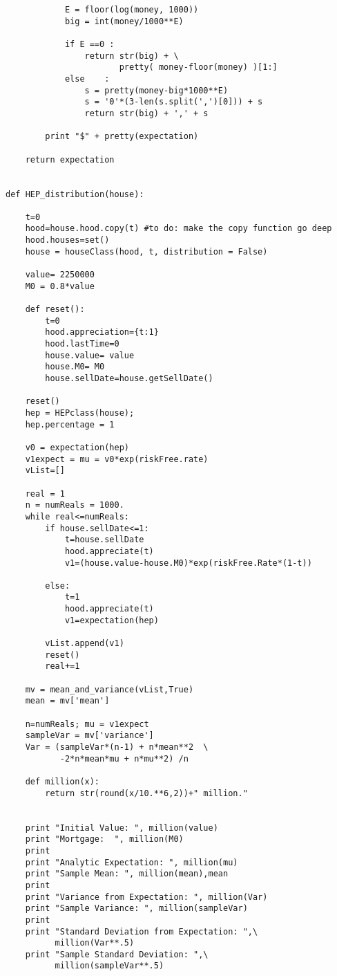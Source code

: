 \begin{lstlisting}
            E = floor(log(money, 1000))
            big = int(money/1000**E)
            
            if E ==0 :
                return str(big) + \
                       pretty( money-floor(money) )[1:]
            else    :
                s = pretty(money-big*1000**E)
                s = '0'*(3-len(s.split(',')[0])) + s
                return str(big) + ',' + s
            
        print "$" + pretty(expectation)

    return expectation


def HEP_distribution(house):
    
    t=0
    hood=house.hood.copy(t) #to do: make the copy function go deep
    hood.houses=set()
    house = houseClass(hood, t, distribution = False)
    
    value= 2250000  
    M0 = 0.8*value  

    def reset():
        t=0
        hood.appreciation={t:1}
        hood.lastTime=0
        house.value= value
        house.M0= M0
        house.sellDate=house.getSellDate()

    reset()
    hep = HEPclass(house);
    hep.percentage = 1

    v0 = expectation(hep)
    v1expect = mu = v0*exp(riskFree.rate)
    vList=[]
    
    real = 1
    n = numReals = 1000.
    while real<=numReals:
        if house.sellDate<=1:
            t=house.sellDate
            hood.appreciate(t)
            v1=(house.value-house.M0)*exp(riskFree.Rate*(1-t))

        else:
            t=1
            hood.appreciate(t)
            v1=expectation(hep)

        vList.append(v1)
        reset()
        real+=1

    mv = mean_and_variance(vList,True)
    mean = mv['mean']
    
    n=numReals; mu = v1expect
    sampleVar = mv['variance']
    Var = (sampleVar*(n-1) + n*mean**2  \
           -2*n*mean*mu + n*mu**2) /n

    def million(x):
        return str(round(x/10.**6,2))+" million."
    
    
    print "Initial Value: ", million(value)
    print "Mortgage:  ", million(M0)
    print
    print "Analytic Expectation: ", million(mu)
    print "Sample Mean: ", million(mean),mean
    print
    print "Variance from Expectation: ", million(Var)
    print "Sample Variance: ", million(sampleVar)
    print
    print "Standard Deviation from Expectation: ",\
          million(Var**.5)
    print "Sample Standard Deviation: ",\
          million(sampleVar**.5)


\end{lstlisting}
